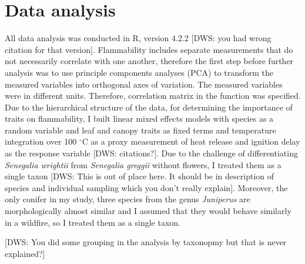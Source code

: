 \documentclass[12pt]{report}
\begin{document}
\section{Data analysis}

All data analysis was conducted in R, version 4.2.2 \citep{RCoreTeam2022} [DWS: you had wrong citation for that version]. Flammability includes separate measurements that do not necessarily correlate with one another, therefore the first step before further analysis was to use principle components analyses (PCA) to transform the measured variables into orthogonal axes of variation. The measured variables were in different units. Therefore, correlation matrix in the  function was specified. Due to the hierarchical structure of the data, for determining the importance of traits on flammability, I built linear mixed effects models with species as a random variable and leaf and canopy traits as fixed terms and temperature integration over 100 $^{\circ}$C as a proxy measurement of heat release and ignition delay as the response variable [DWS: citations?]. Due to the challenge of differentiating \emph{Senegalia wrightii} from \emph{Senegalia greggii} without flowers, I treated them as a single taxon [DWS: This is out of place here. It should be in description of species and individual sampling which you don't really explain]. Moreover, the only conifer in my study, three species from the genus \emph{Juniperus} are morphologically almost similar and I assumed that they would behave similarly in a wildfire, so I treated them as a single taxon.

[DWS: You did some grouping in the analysis by taxonopmy but that is never explained?]
\end{document}
